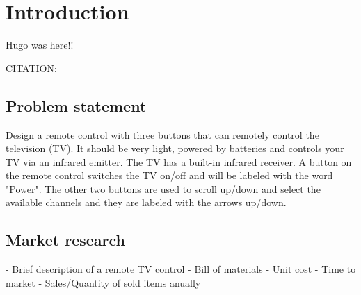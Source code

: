 %
%
%
\chapter{Introduction}%
\label{ch:introduction}
Hugo was here!!

CITATION:~\cite{sommerville2011software}

\section{Problem statement}
\label{sec:prob-stat}
    Design a remote control with three buttons that can
remotely control the television (TV). It should be very
light, powered by batteries and controls your TV via an
infrared emitter. The TV has a built-in infrared receiver. A
button on the remote control switches the TV on/off and
will be labeled with the word "Power". The other two
buttons are used to scroll up/down and select the available
channels and they are labeled with the arrows up/down.

\section{Market research}
\label{sec:market-research}
- Brief description of a remote TV control
- Bill of materials
- Unit cost
- Time to market
- Sales/Quantity of sold items anually

%

